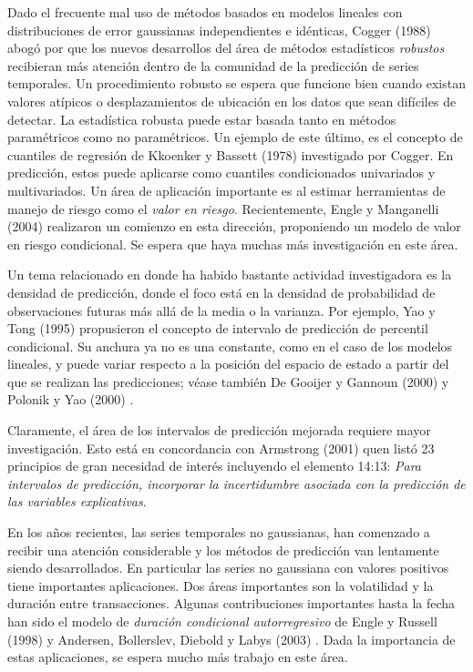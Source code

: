\documentclass{llncs}
\begin{document}
Dado el frecuente mal uso de métodos basados en modelos lineales con distribuciones de error gaussianas independientes e idénticas, Cogger (1988) \cite{Cogger1988403} abogó por que los nuevos desarrollos del área de métodos estadísticos \emph{robustos} recibieran más atención dentro de la comunidad de la predicción de series temporales. Un procedimiento robusto se espera que funcione bien cuando existan valores atípicos o desplazamientos de ubicación en los datos que sean difíciles de detectar. La estadística robusta puede estar basada tanto en métodos paramétricos como no paramétricos. Un ejemplo de este último, es el concepto de cuantiles de regresión de Kkoenker y Bassett (1978) \cite{Koenker197833} investigado por Cogger. En predicción, estos puede aplicarse como cuantiles condicionados univariados y multivariados. Un área de aplicación importante es al estimar herramientas de manejo de riesgo como el \emph{valor en riesgo}. Recientemente, Engle y Manganelli (2004) \cite{Engle2004367} realizaron un comienzo en esta dirección, proponiendo un modelo de valor en riesgo condicional. Se espera que haya muchas más investigación en este área.

Un tema relacionado en donde ha habido bastante actividad investigadora es la densidad de predicción, donde el foco está en la densidad de probabilidad de observaciones futuras más allá de la media o la varianza. Por ejemplo, Yao y Tong (1995) \cite{Yao1995395} propusieron el concepto de intervalo de predicción de percentil condicional. Su anchura ya no es una constante, como en el caso de los modelos lineales, y puede variar respecto a la posición del espacio de estado a partir del que se realizan las predicciones; véase también De Gooijer y Gannoun (2000) \cite{DeGooijer2004237} y Polonik y Yao (2000) \cite{Polonik2000509}.

Claramente, el área de los intervalos de predicción mejorada requiere mayor investigación. Esto está en concordancia con Armstrong (2001) \cite{Armstrong2001} quen listó 23 principios de gran necesidad de interés incluyendo el elemento 14:13: \emph{Para intervalos de predicción, incorporar la incertidumbre asociada con la predicción de las variables explicativas}.


En los años recientes, las series temporales no gaussianas, han comenzado a recibir una atención considerable y los métodos de predicción van lentamente siendo desarrollados. En particular las series no gaussiana con valores positivos tiene importantes aplicaciones. Dos áreas importantes son la volatilidad y la duración entre transacciones. Algunas contribuciones importantes hasta la fecha han sido el modelo de \emph{duración condicional autorregresivo} de Engle y Russell (1998) \cite{Engle19981127} y Andersen, Bollerslev, Diebold y Labys (2003) \cite{Andersen2003579}. Dada la importancia de estas aplicaciones, se espera mucho más trabajo en este área.








\end{document}
